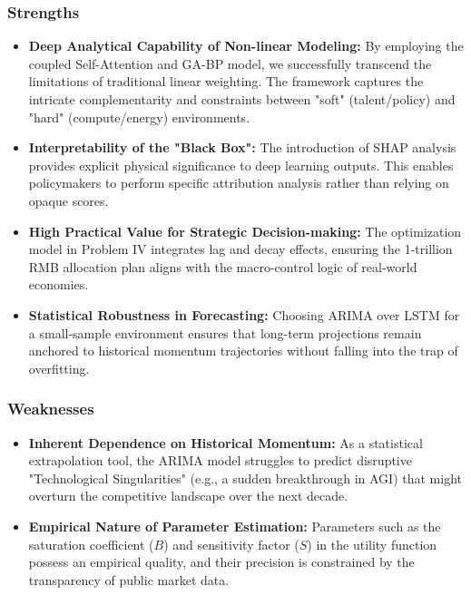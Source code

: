 \documentclass[12pt]{article}
\begin{document}
	\subsubsection{Strengths}
	\begin{itemize}
		\item \textbf{Deep Analytical Capability of Non-linear Modeling:} By employing the coupled Self-Attention and GA-BP model, we successfully transcend the limitations of traditional linear weighting. The framework captures the intricate complementarity and constraints between "soft" (talent/policy) and "hard" (compute/energy) environments.
		\item \textbf{Interpretability of the "Black Box":} The introduction of SHAP analysis provides explicit physical significance to deep learning outputs. This enables policymakers to perform specific attribution analysis rather than relying on opaque scores.
		\item \textbf{High Practical Value for Strategic Decision-making:} The optimization model in Problem IV integrates lag and decay effects, ensuring the 1-trillion RMB allocation plan aligns with the macro-control logic of real-world economies.
		\item \textbf{Statistical Robustness in Forecasting:} Choosing ARIMA over LSTM for a small-sample environment ensures that long-term projections remain anchored to historical momentum trajectories without falling into the trap of overfitting.
	\end{itemize}
	\subsubsection{Weaknesses}
	\begin{itemize}
		\item \textbf{Inherent Dependence on Historical Momentum:} As a statistical extrapolation tool, the ARIMA model struggles to predict disruptive "Technological Singularities" (e.g., a sudden breakthrough in AGI) that might overturn the competitive landscape over the next decade.
		\item \textbf{Empirical Nature of Parameter Estimation:} Parameters such as the saturation coefficient ($B$) and sensitivity factor ($S$) in the utility function possess an empirical quality, and their precision is constrained by the transparency of public market data.
	\end{itemize}
	
\end{document}
